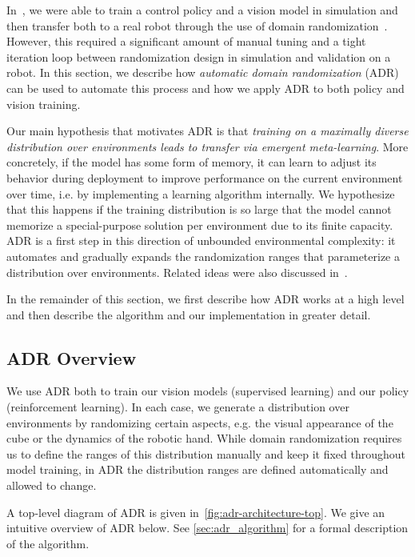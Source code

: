 In~\cite{openai2018learning}, we were able to train a control policy and a vision model in simulation and then transfer both to a real robot through the use of domain randomization~\cite{tobin2017domain, peng2017sim}. However, this required a significant amount of manual tuning and a tight iteration loop between randomization design in simulation and validation on a robot. In this section, we describe how \emph{automatic domain randomization} (ADR) can be used to automate this process and how we apply ADR to both policy and vision training.

Our main hypothesis that motivates ADR is that \textit{training on a maximally diverse distribution over environments leads to transfer via emergent meta-learning}. More concretely, if the model has some form of memory, it can learn to adjust its behavior during deployment to improve performance on the current environment over time, i.e. by implementing a learning algorithm internally. We hypothesize that this happens if the training distribution is so large that the model cannot memorize a special-purpose solution per environment due to its finite capacity. ADR is a first step in this direction of unbounded environmental complexity: it automates and gradually expands the randomization ranges that parameterize a distribution over environments. Related ideas were also discussed in~\cite{DBLP:journals/corr/DuanSCBSA16, botvinick2019reinforcement, wang2019poet, clune2019ai}.

In the remainder of this section, we first describe how ADR works at a high level and then describe the algorithm and our implementation in greater detail.

\subsection{ADR Overview}
We use ADR both to train our vision models (supervised learning) and our policy (reinforcement learning). In each case, we generate a distribution over environments by randomizing certain aspects, e.g. the visual appearance of the cube or the dynamics of the robotic hand. While domain randomization requires us to define the ranges of this distribution manually and keep it fixed throughout model training, in ADR the distribution ranges are defined automatically and allowed to change.

A top-level diagram of ADR is given in~\autoref{fig:adr-architecture-top}. We give an intuitive overview of ADR below. See \autoref{sec:adr_algorithm} for a formal description of the algorithm.

